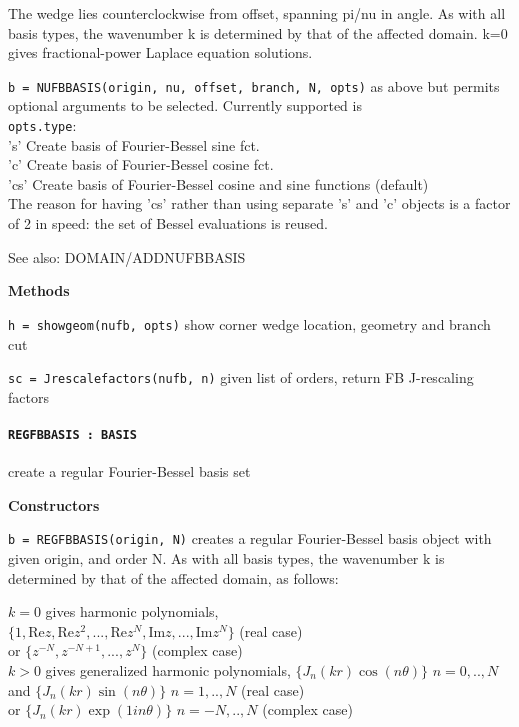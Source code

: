    The wedge lies counterclockwise from offset, spanning pi/nu in angle.
   As with all basis types, the wavenumber k is determined by that of the
   affected domain. k=0 gives fractional-power Laplace equation solutions.

 {\tt b = NUFBBASIS(origin, nu, offset, branch, N, opts)} as above but permits
   optional arguments to be selected. Currently supported is\\
         {\tt opts.type}:\\    's'  Create basis of Fourier-Bessel sine fct.\\
                          'c'  Create basis of Fourier-Bessel cosine fct.\\
                          'cs' Create basis of Fourier-Bessel cosine and
                               sine functions (default)\\
   The reason for having 'cs' rather than using separate 's' and 'c' objects
   is a factor of 2 in speed: the set of Bessel evaluations is reused.

See also: DOMAIN/ADDNUFBBASIS

\textbf{Methods}

{\tt h = showgeom(nufb, opts)} 
show corner wedge location, geometry and branch cut

{\tt sc = Jrescalefactors(nufb, n)} given list of orders, return FB
J-rescaling factors


\newpage

\paragraph{\tt REGFBBASIS : BASIS} create a regular Fourier-Bessel basis set

\textbf{Constructors}

{\tt b = REGFBBASIS(origin, N)} creates a regular Fourier-Bessel basis object
   with given origin, and order N. As with all basis types, the wavenumber
   k is determined by that of the affected domain, as follows:

   $k=0$ gives harmonic polynomials,\\
       $\{1, \text{Re} z, \text{Re} z^2, ..., \text{Re} z^N, \text{Im} z, ..., \text{Im} z^N\}$ (real case)\\
    or $\{z^{-N}, z^{-N+1}, ..., z^N\}$ (complex case)\\
  $k>0$ gives generalized harmonic polynomials,
       $\{J_n(kr)\cos(n\theta)\}$ $n=0,..,N$ and
       $\{J_n(kr)\sin(n\theta)\}$ $n=1,..,N$ (real case)\\
    or $\{J_n(kr)\exp(1in\theta)\}$ $n=-N,..,N$ (complex case)

